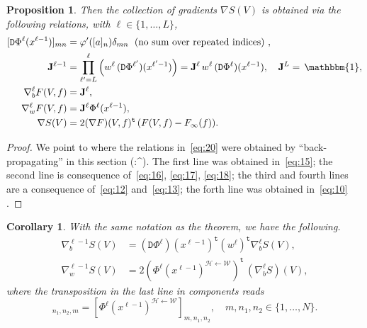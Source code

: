 \documentclass[10pt, a4paper]{article}
\theoremstyle{plain}
\newtheorem{proposition}[theorem]{Proposition}
\newtheorem{corollary}{Corollary}[theorem]
\theoremstyle{definition}
\theoremstyle{definition}
\theoremstyle{definition}
\theoremstyle{definition}
\theoremstyle{definition}
\theoremstyle{definition}
\theoremstyle{definition}
\theoremstyle{remark}
\theoremstyle{remark}
\theoremstyle{rudin-style-generic}
\theoremstyle{rudin-style-generic*}
\theoremstyle{rudin-style-theorem}
\newcommand{\id}{\,\mathbbm{1}}
\begin{document}
\begin{proposition}
    Then the collection of gradients $\nabla S(V)$ is obtained via the following relations,
    with $\ell\in\{1,\dots,L\}$,
    \begin{equation}
      \label{eq:20}
      \begin{aligned}
        [\mathtt D\Phi^\ell(x^{\ell-1})]_{mn} &= \varphi'( [a]_n) \delta_{mn} \; \text{ (no sum over repeated indices) } ,\\
        \mathbf{J}^{\ell-1} &= \prod_{\ell'=L}^{\ell} \left(   w^\ell \,  (\mathtt D \Phi^{\ell'})  (x^{\ell'-1}) \right)
                             =   \mathbf J^{\ell} \, w^{\ell} \, (\mathtt D\Phi^{\ell}) (x^{\ell-1})  ,
                             \quad \mathbf J^L =\id  , \\
        \nabla^{\ell}_b F(V,f) &= \mathbf J^{\ell}  ,\\
        \nabla^{\ell}_w F(V,f) &= \mathbf J^{\ell} \Phi^{\ell}( x^{\ell-1} ) ,\\ 
        \nabla S(V) &= 2 (\nabla F)(V,f)^{\mathtt t} \,  (F(V,f) - F_\infty(f) )
                      .
      \end{aligned}
    \end{equation}
  \end{proposition}
  \begin{proof}
    We point to where the relations in~\eqref{eq:20} were obtained by ``back-propagating'' in this section (:\string^).
    The first line was obtained in~\eqref{eq:15};
    the second line is consequence of~\eqref{eq:16}, \eqref{eq:17}, \eqref{eq:18};
    the third and fourth lines are a consequence of~\eqref{eq:12} and~\eqref{eq:13};
    the forth line was obtained in~\eqref{eq:10}
    .
  \end{proof}
  \begin{corollary}
    With the same notation as the theorem, we have the following.
    \begin{align*}
      \nabla^{\ell-1}_b S( V )
      &= (\mathtt D \Phi^\ell)(x^{\ell-1} )^{\mathtt t} (w^\ell)^{\mathtt t} \nabla^{\ell}_b S( V ) , \\
      \nabla^{\ell-1}_w S( V )  
      &=2 ( \Phi^{\ell} (x^{\ell-1})^{\mathcal H\leftarrow\mathcal W} )^{\mathtt t}   \, (\nabla^{\ell}_b S)( V )
                                 ,
    \end{align*}
    where the transposition in the last line in components reads
    \begin{equation*}
      [ (\Phi^{\ell}(x^{\ell-1}) ^{\mathcal H\leftarrow\mathcal W})^{\mathtt t} ]_{n_1,n_2,m} = [\Phi^{\ell}(x^{\ell-1}) ^{\mathcal H\leftarrow\mathcal W}]_{m,n_1,n_2}
      ,
      \quad m,n_1,n_2\in\{1,\dots,N\}
      .
    \end{equation*}
  \end{corollary}
\end{document}
